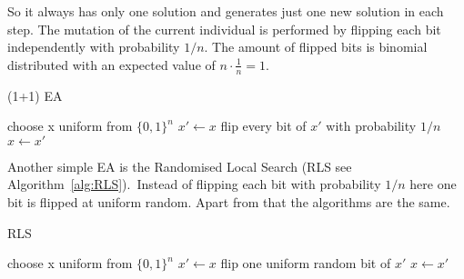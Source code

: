 So it always has only one solution and generates just one new solution in each step.
The mutation of the current individual is performed by flipping each bit independently with probability $1/n$.
The amount of flipped bits is binomial distributed with an expected value of $n\cdot\frac{1}{n}=1$.
\begin{algorithm}[bt]
      \caption{\textsc{(1+1) EA}}\label{alg:EA}

      \DontPrintSemicolon %

      \BlankLine
      choose x uniform from ${\{0,1\}}^n$\;
      {
      $x' \leftarrow x$\;
      flip every bit of $x'$ with probability $1/n$\;
      {
      {
            $x \leftarrow x'$\;
      }
      }
      }
\end{algorithm}
Another simple EA is the Randomised Local Search (RLS see Algorithm~\ref{alg:RLS}).\
Instead of flipping each bit with probability $1/n$ here one bit is flipped at uniform random.
Apart from that the algorithms are the same.
\begin{algorithm}[bt]
      \caption{\textsc{RLS}}\label{alg:RLS}

      \DontPrintSemicolon %

      \BlankLine
      choose x uniform from ${\{0,1\}}^n$\;
      {
      $x' \leftarrow x$\;
      flip one uniform random bit of $x'$\;
      {
      {
            $x \leftarrow x'$\;
      }
      }
      }
\end{algorithm}

